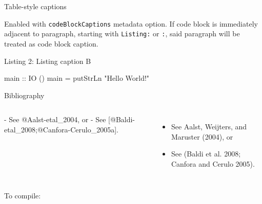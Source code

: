 \documentclass[10pt,ignorenonframetext,serif,onlymath]{beamer}
\newenvironment{Shaded}{}{}
\newcommand{\DataTypeTok}[1]{\textcolor[rgb]{0.56,0.13,0.00}{#1}}
\newcommand{\ExtensionTok}[1]{#1}
\newcommand{\FloatTok}[1]{\textcolor[rgb]{0.25,0.63,0.44}{#1}}
\newcommand{\FunctionTok}[1]{\textcolor[rgb]{0.02,0.16,0.49}{#1}}
\newcommand{\NormalTok}[1]{#1}
\newcommand{\OtherTok}[1]{\textcolor[rgb]{0.00,0.44,0.13}{#1}}
\newcommand{\StringTok}[1]{\textcolor[rgb]{0.25,0.44,0.63}{#1}}
\providecommand{\tightlist}{%
  \setlength{\itemsep}{0pt}\setlength{\parskip}{0pt}}
\begin{document}
\begin{frame}[fragile]{Table-style captions}
\protect\hypertarget{sec:table-capts}{}

Enabled with \texttt{codeBlockCaptions} metadata option. If code block
is immediately adjacent to paragraph, starting with \texttt{Listing:} or
\texttt{:}, said paragraph will be treated as code block caption.

\leavevmode\hypertarget{lst:tableCaption}{}%
Listing 2: Listing caption B

\begin{Shaded}
\begin{Highlighting}[]
\OtherTok{main ::} \DataTypeTok{IO}\NormalTok{ ()}
\NormalTok{main }\FunctionTok{=}\NormalTok{ putStrLn }\StringTok{"Hello World!"}
\end{Highlighting}
\end{Shaded}

\end{frame}

\begin{frame}[fragile]{Bibliography}
\protect\hypertarget{sec:bibliography}{}

\scriptsize

\begin{columns}


\begin{Shaded}
\begin{Highlighting}[]

\NormalTok{- }\FloatTok{See @Aalst-etal_2004, or}
\FloatTok{- See [@Baldi-etal_2008;@Canfora-Cerulo_2005a].}
\end{Highlighting}
\end{Shaded}


\begin{itemize}
\tightlist
\item
  See Aalst, Weijters, and Maruster (2004), or
\item
  See (Baldi et al. 2008; Canfora and Cerulo 2005).
\end{itemize}

\end{columns}

To compile:

\begin{Shaded}
\end{Shaded}

\end{frame}
\end{document}
